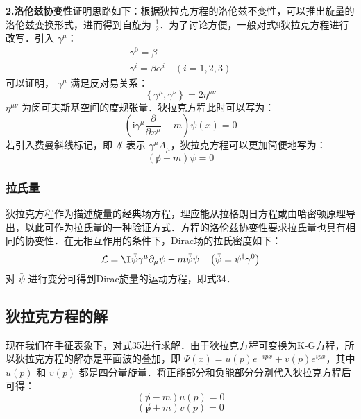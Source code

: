 \textbf{2.洛伦兹协变性}证明思路如下：根据狄拉克方程的洛伦兹不变性，可以推出旋量的洛伦兹变换形式，进而得到自旋为 $\frac{1}{2}$．为了讨论方便，一般对式9狄拉克方程进行改写．引入 $\gamma^{\mu}$：
\begin{equation}
\begin{array}{l}
\gamma^{0}=\beta \\
\gamma^{i}=\beta \alpha^{i} \quad(i=1,2,3)
\end{array}
\end{equation}
可以证明， $\gamma^{\mu}$ 满足反对易关系：
\begin{equation}
\left\{\gamma^{\mu}, \gamma^{\nu}\right\}=2 \eta^{\mu \nu}
\end{equation}
$\eta^{\mu \nu}$ 为闵可夫斯基空间的度规张量．狄拉克方程此时可以写为：
\begin{equation}
\left(\mathrm{i} \gamma^{\mu} \frac{\partial}{\partial x^{\mu}}-m\right) \psi(x)=0
\end{equation}
若引入费曼斜线标记，即 $\not A$ 表示 $\gamma^{\mu}A_{\mu}$，狄拉克方程可以更加简便地写为：
\begin{equation}\label{qed4_eq21}
( \not p-m) \psi=0
\end{equation}
\subsubsection{拉氏量}
狄拉克方程作为描述旋量的经典场方程，理应能从拉格朗日方程或由哈密顿原理导出，以此可作为拉氏量的一种验证方式．方程的洛伦兹协变性要求拉氏量也具有相同的协变性．在无相互作用的条件下，Dirac场的拉氏密度如下：
\begin{equation}\label{qed4_eq20}
\mathcal{L}=\mathrm{\I} \bar{\psi} \gamma^{\mu} \partial_{\mu} \psi-m \bar{\psi} \psi \quad\left(\bar{\psi}=\psi^{\dagger} \gamma^{0}\right)
\end{equation}
对 $\bar\psi$ 进行变分可得到Dirac旋量的运动方程，即式34．

\subsection{狄拉克方程的解}
现在我们在手征表象下，对式35进行求解．由于狄拉克方程可变换为K-G方程，所以狄拉克方程的解亦是平面波的叠加，即 $\Psi(x)=u(p)e^{-ipx}+v(p)e^{ipx}$，其中 $u(p)$ 和 $v(p)$ 都是四分量旋量．将正能部分和负能部分分别代入狄拉克方程后可得：
\begin{equation}
(\not p-m) u(p)=0 
\end{equation}
\begin{equation}
(\not p+m) v(p)=0
\end{equation}

